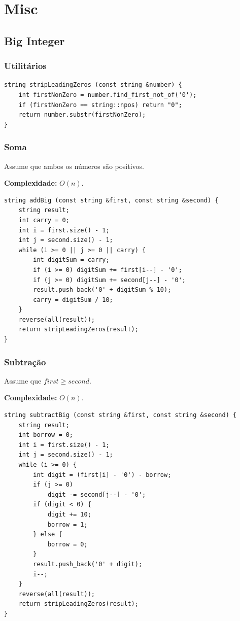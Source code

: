 \section{Misc}

\subsection{Big Integer}

\subsubsection*{Utilitários}

\begin{lstlisting}
string stripLeadingZeros (const string &number) {
    int firstNonZero = number.find_first_not_of('0');
    if (firstNonZero == string::npos) return "0";
    return number.substr(firstNonZero);
}
\end{lstlisting}

\subsubsection*{Soma}

Assume que ambos os números são positivos.

\textbf{Complexidade:} $O(n)$.

\begin{lstlisting}
string addBig (const string &first, const string &second) {
    string result;
    int carry = 0;
    int i = first.size() - 1;
    int j = second.size() - 1;
    while (i >= 0 || j >= 0 || carry) {
        int digitSum = carry;
        if (i >= 0) digitSum += first[i--] - '0';
        if (j >= 0) digitSum += second[j--] - '0';
        result.push_back('0' + digitSum % 10);
        carry = digitSum / 10;
    }
    reverse(all(result));
    return stripLeadingZeros(result);
}
\end{lstlisting}

\subsubsection*{Subtração}

Assume que $first \geq second$.

\textbf{Complexidade:} $O(n)$.

\begin{lstlisting}
string subtractBig (const string &first, const string &second) {
    string result;
    int borrow = 0;
    int i = first.size() - 1;
    int j = second.size() - 1;
    while (i >= 0) {
        int digit = (first[i] - '0') - borrow;
        if (j >= 0)
            digit -= second[j--] - '0';
        if (digit < 0) {
            digit += 10;
            borrow = 1;
        } else {
            borrow = 0;
        }
        result.push_back('0' + digit);
        i--;
    }
    reverse(all(result));
    return stripLeadingZeros(result);
}
\end{lstlisting}

